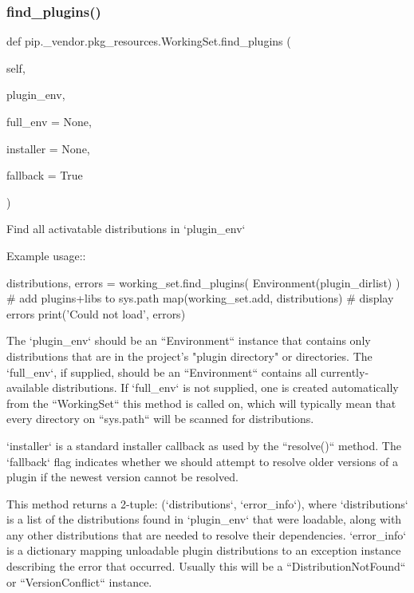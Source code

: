 \subsubsection{\texorpdfstring{find\+\_\+plugins()}{find\_plugins()}}
{\footnotesize\ttfamily def pip.\+\_\+vendor.\+pkg\+\_\+resources.\+Working\+Set.\+find\+\_\+plugins (\begin{DoxyParamCaption}\item[{}]{self,  }\item[{}]{plugin\+\_\+env,  }\item[{}]{full\+\_\+env = {\ttfamily None},  }\item[{}]{installer = {\ttfamily None},  }\item[{}]{fallback = {\ttfamily True} }\end{DoxyParamCaption})}

\begin{DoxyVerb}Find all activatable distributions in `plugin_env`

Example usage::

    distributions, errors = working_set.find_plugins(
Environment(plugin_dirlist)
    )
    # add plugins+libs to sys.path
    map(working_set.add, distributions)
    # display errors
    print('Could not load', errors)

The `plugin_env` should be an ``Environment`` instance that contains
only distributions that are in the project's "plugin directory" or
directories. The `full_env`, if supplied, should be an ``Environment``
contains all currently-available distributions.  If `full_env` is not
supplied, one is created automatically from the ``WorkingSet`` this
method is called on, which will typically mean that every directory on
``sys.path`` will be scanned for distributions.

`installer` is a standard installer callback as used by the
``resolve()`` method. The `fallback` flag indicates whether we should
attempt to resolve older versions of a plugin if the newest version
cannot be resolved.

This method returns a 2-tuple: (`distributions`, `error_info`), where
`distributions` is a list of the distributions found in `plugin_env`
that were loadable, along with any other distributions that are needed
to resolve their dependencies.  `error_info` is a dictionary mapping
unloadable plugin distributions to an exception instance describing the
error that occurred. Usually this will be a ``DistributionNotFound`` or
``VersionConflict`` instance.
\end{DoxyVerb}
 \mbox{\label{classpip_1_1__vendor_1_1pkg__resources_1_1WorkingSet_a27ffb04e9ea00f4300200e68f68f8d86}} 
